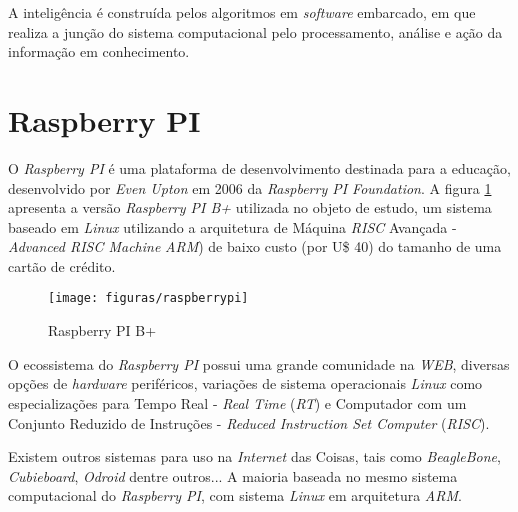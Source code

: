 A inteligência é construída pelos algoritmos em \textit{software} embarcado, em
que realiza a junção do sistema computacional pelo processamento, análise e
ação da informação em conhecimento.

\section{Raspberry PI}

O \textit{Raspberry PI} é uma plataforma de desenvolvimento destinada para a
educação, desenvolvido por \textit{Even Upton} em 2006 da \textit{Raspberry PI
Foundation}. A figura \ref{fig:raspberrypi} apresenta a versão
\textit{Raspberry PI B+} utilizada no objeto de estudo, um sistema baseado em
\textit{Linux} utilizando a arquitetura de Máquina \textit{RISC} Avançada -
\textit{Advanced RISC Machine} \textit{ARM}) de baixo custo (por U\$ 40) do
tamanho de uma cartão de crédito.

\begin{figure}[H]
    \centering
    \texttt{[image: figuras/raspberrypi]}
    \caption{Raspberry PI B+}
    \label{fig:raspberrypi}
\end{figure}

O ecossistema do \textit{Raspberry PI} possui uma grande comunidade na
\textit{WEB}, diversas opções de \textit{hardware} periféricos, variações de
sistema operacionais \textit{Linux} como especializações para Tempo Real -
\textit{Real Time} (\textit{RT}) e Computador com um Conjunto Reduzido de
Instruções - \textit{Reduced Instruction Set Computer} (\textit{RISC}).

Existem outros sistemas para uso na \textit{Internet} das Coisas, tais como
\textit{BeagleBone}, \textit{Cubieboard}, \textit{Odroid} dentre outros... A
maioria baseada no mesmo sistema computacional do \textit{Raspberry PI}, com
sistema \textit{Linux} em arquitetura \textit{ARM}.
